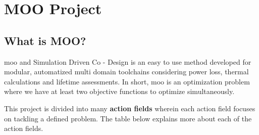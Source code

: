 \chapter{MOO Project}

\section{What is MOO?}
\acrfull{moo} and Simulation Driven Co - Design is an easy to use method developed for modular, automatized multi domain toolchains considering power loss, thermal calculations and 
lifetime assessments. In short, \ac{moo} is an optimization problem where we have at least two objective functions to optimize simultaneously.

This project is divided into many \textbf{action fields} wherein each action field focuses on tackling a defined problem. The table below explains more
about each of the action fields.

